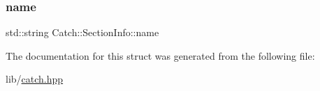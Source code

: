 \hypertarget{struct_catch_1_1_section_info_a704c8fc662d309137e0d4f199cb7df58}{}\label{struct_catch_1_1_section_info_a704c8fc662d309137e0d4f199cb7df58} 
\subsubsection{\texorpdfstring{name}{name}}
{\footnotesize\ttfamily std\+::string Catch\+::\+Section\+Info\+::name}



The documentation for this struct was generated from the following file\+:\begin{DoxyCompactItemize}
\item 
lib/\hyperlink{catch_8hpp}{catch.\+hpp}\end{DoxyCompactItemize}
